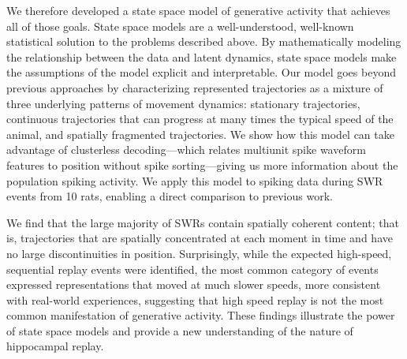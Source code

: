 \documentclass[times, twoside]{zHenriquesLab-StyleBioRxiv}
\begin{document}
We therefore developed a state space model of generative activity that achieves all of those goals. State space models are a well-understood, well-known statistical solution to the problems described above. By mathematically modeling the relationship between the data and latent dynamics, state space models make the assumptions of the model explicit and interpretable. Our model goes beyond previous approaches \cite{MaboudiUncoveringtemporalstructure2018, DengRapidclassificationhippocampal2016} by characterizing represented trajectories as a mixture of three underlying patterns of movement dynamics: stationary trajectories, continuous trajectories that can progress at many times the typical speed of the animal, and spatially fragmented trajectories. We show how this model can take advantage of clusterless decoding---which relates multiunit spike waveform features to position without spike sorting---giving us more information about the population spiking activity. We apply this model to spiking data during SWR events from 10 rats, enabling a direct comparison to previous work. 

We find that the large majority of SWRs contain spatially coherent content; that is, trajectories that are spatially concentrated at each moment in time and have no large discontinuities in position. Surprisingly, while the expected high-speed, sequential replay events were identified, the most common category of events expressed representations that moved at much slower speeds, more consistent with real-world experiences, suggesting that high speed replay is not the most common manifestation of generative activity. These findings illustrate the power of state space models and provide a new understanding of the nature of hippocampal replay.
\end{document}
